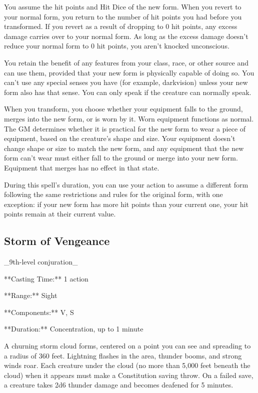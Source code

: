 You assume the hit points and Hit Dice of the new form. When you revert to your normal form, you return to the number of hit points you had before you transformed. If you revert as a result of dropping to 0 hit points, any excess damage carries over to your normal form. As long as the excess damage doesn’t reduce your normal form to 0 hit points, you aren’t knocked unconscious.

You retain the benefit of any features from your class, race, or other source and can use them, provided that your new form is physically capable of doing so. You can’t use any special senses you have (for example, darkvision) unless your new form also has that sense. You can only speak if the creature can normally speak.

When you transform, you choose whether your equipment falls to the ground, merges into the new form, or is worn by it. Worn equipment functions as normal. The GM determines whether it is practical for the new form to wear a piece of equipment, based on the creature’s shape and size. Your equipment doesn’t change shape or size to match the new form, and any equipment that the new form can’t wear must either fall to the ground or merge into your new form. Equipment that merges has no effect in that state.

During this spell’s duration, you can use your action to assume a different form following the same restrictions and rules for the original form, with one exception: if your new form has more hit points than your current one, your hit points remain at their current value.

\subsection{Storm of Vengeance}

_9th-level conjuration_

**Casting Time:** 1 action

**Range:** Sight

**Components:** V, S

**Duration:** Concentration, up to 1 minute

A churning storm cloud forms, centered on a point you can see and spreading to a radius of 360 feet. Lightning flashes in the area, thunder booms, and strong winds roar. Each creature under the cloud (no more than 5,000 feet beneath the cloud) when it appears must make a Constitution saving throw. On a failed save, a creature takes 2d6 thunder damage and becomes deafened for 5 minutes.

